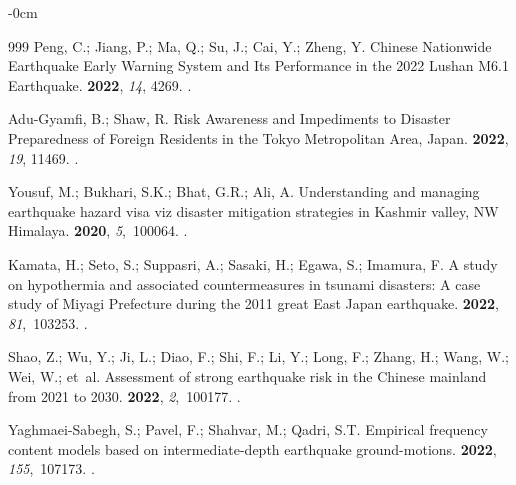 \documentclass[sustainability,article,accept,pdftex,moreauthors]{Definitions/mdpi}
\begin{document}
\begin{adjustwidth}{-\extralength}{0cm}
\begin{thebibliography}{999}
Peng, C.; Jiang, P.; Ma, Q.; Su, J.; Cai, Y.; Zheng, Y.
\newblock Chinese Nationwide Earthquake Early Warning System and Its
  Performance in the 2022 Lushan M6.1 Earthquake.
 {\bf 2022}, {\em 14}, 4269.
.

Adu-Gyamfi, B.; Shaw, R.
\newblock Risk Awareness and Impediments to Disaster Preparedness of Foreign
  Residents in the Tokyo Metropolitan Area, Japan.
 {\bf 2022}, {\em 19}, 11469.
.

Yousuf, M.; Bukhari, S.K.; Bhat, G.R.; Ali, A.
\newblock Understanding and managing earthquake hazard visa viz disaster
  mitigation strategies in Kashmir valley, NW Himalaya.
 {\bf 2020}, {\em 5},~100064.
.

Kamata, H.; Seto, S.; Suppasri, A.; Sasaki, H.; Egawa, S.; Imamura, F.
\newblock A study on hypothermia and associated countermeasures in tsunami
  disasters: A case study of Miyagi Prefecture during the 2011 great East Japan
  earthquake.
 {\bf 2022},
  {\em 81},~103253.
.

Shao, Z.; Wu, Y.; Ji, L.; Diao, F.; Shi, F.; Li, Y.; Long, F.; Zhang, H.; Wang,
  W.; Wei, W.;  et~al.
\newblock Assessment of strong earthquake risk in the Chinese mainland from
  2021 to 2030.
 {\bf 2022}, {\em 2},~100177. %
.

Yaghmaei-Sabegh, S.; Pavel, F.; Shahvar, M.; Qadri, S.T.
\newblock Empirical frequency content models based on intermediate-depth
  earthquake ground-motions.
 {\bf 2022}, {\em
  155},~107173.
.


\end{thebibliography}
\end{adjustwidth}
\end{document}
